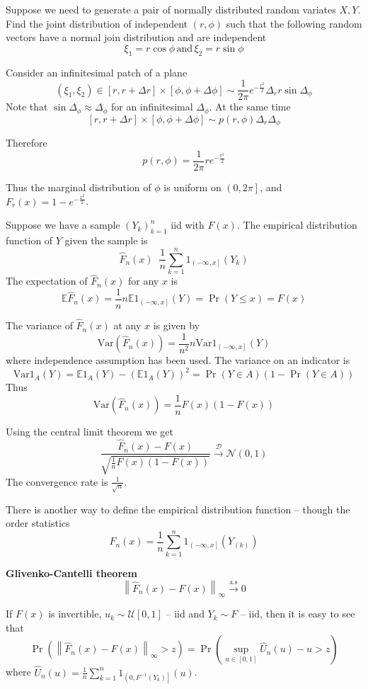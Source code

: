 \documentclass[a4paper]{article}
\newcommand{\clo}[1]{{\left [ #1 \right ]}}
\newcommand{\ploc}[1]{{\left ( #1 \right ]}}
\newcommand{\brac}[1]{{\left ( #1 \right )}}
\newcommand{\nrm}[1]{{\left\| #1 \right \|}}
\newcommand{\Ex}{\mathbb{E}}
\newcommand{\Var}{\text{Var}}
\newcommand{\defn}{\mathop{\overset{\Delta}{=}}\nolimits}
\begin{document}
Suppose we need to generate a pair of normally distributed random variates $X,Y$.
Find the joint distribution of independent $(r,\phi)$ such that the following random vectors have a normal join distribution and are independent
\[\xi_1 = r \cos\phi\,\text{and}\,\xi_2 = r \sin\phi\]

Consider an infinitesimal patch of a plane
\[(\xi_1, \xi_2)\in\clo{r,r+\Delta r}\times \clo{\phi,\phi+\Delta \phi}\sim
\frac{1}{2\pi} e^{-\frac{r^2}{2}} \Delta_r r\sin \Delta_\phi\]
Note that $\sin\Delta_\phi\approx \Delta_\phi$ for an infinitesimal $\Delta_\phi$. At the same time
\[\clo{r,r+\Delta r}\times \clo{\phi,\phi+\Delta \phi} \sim p(r,\phi) \Delta_r\Delta_\phi\] 

Therefore
\[p(r,\phi) = \frac{1}{2\pi} r e^{-\frac{r^2}{2}}\]

Thus the marginal distribution of $\phi$ is uniform on $\ploc{0,2\pi}$, and $F_r(x) = 1 - e^{-\frac{x^2}{2}}$.


Suppose we have a sample $\brac{Y_k}_{k=1}^n$ iid with $F(x)$. The empirical distribution function of $Y$ given the sample is 
\[\hat{F}_n(x) \defn \frac{1}{n}\sum_{k=1}^n 1_\ploc{-\infty, x}(Y_k)\]
The expectation of $\hat{F}_n(x)$ for any $x$ is 
\[\Ex \hat{F}_n(x) = \frac{1}{n} n \Ex1_\ploc{-\infty, x}(Y) = \Pr\brac{Y\leq x} = F(x)\]

The variance of $\hat{F}_n(x)$ at any $x$ is given by
\[\Var\brac{\hat{F}_n(x)} = \frac{1}{n^2}n \Var{1_\ploc{-\infty, x}(Y)}\]
where independence assumption has been used.
The variance on an indicator is
\[\Var{1_A(Y)} = \Ex 1_A(Y) - \brac{\Ex 1_A(Y)}^2 = \Pr(Y\in A)\brac{1-\Pr(Y\in A)}\]
Thus \[\Var\brac{\hat{F}_n(x)} = \frac{1}{n} F(x)\brac{1-F(x)}\]

Using the central limit theorem we get
\[\frac{\hat{F}_n(x) - F(x)}{\sqrt{\frac{1}{n} F(x)\brac{1-F(x)}}}\overset{\mathcal{D}}{\to} \mathcal{N}(0,1)\]
The convergence rate is $\frac{1}{\sqrt{n}}$.

There is another way to define the empirical distribution function -- though the order statistics
\[\hat{F}_n(x) = \frac{1}{n}\sum_{k=1}^n 1_\ploc{-\infty,x}(Y_{(k)})\]

\noindent\textbf{Glivenko-Cantelli theorem}\hfill\\
\[\nrm{\hat{F}_n(x) - F(x)}_\infty \overset{\text{a.s}}{\to} 0\]

If $F(x)$ is invertible, $u_k\sim\mathcal{U}\clo{0,1}$ -- iid and $Y_k\sim F$ -- iid, then it is easy to see that 
\[\Pr\brac{\nrm{\hat{F}_n(x) - F(x)}_\infty>z} = \Pr\brac{\sup_{u\in\clo{0,1}}{\hat{U}_n(u) - u}>z}\]
where $\hat{U}_n(u) = \frac{1}{n}\sum_{k=1}^n 1_\ploc{0,F^{-1}(Y_k)}(u)$.
\end{document}
